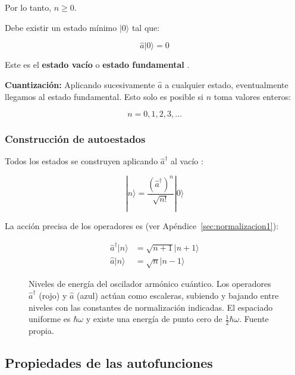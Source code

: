 \documentclass[11pt,a4paper,spanish]{book}
\begin{document}
Por lo tanto, $n \geq 0$.

Debe existir un estado mínimo $|0\rangle$ tal que:

\begin{equation}
	\hat{a}|0\rangle = 0
\end{equation}

Este es el \textbf{estado vacío} o \textbf{estado fundamental} \citep{dirac1930}.

\textbf{Cuantización:} Aplicando sucesivamente $\hat{a}$ a cualquier estado, eventualmente llegamos al estado fundamental. Esto solo es posible si $n$ toma valores enteros:

\begin{equation}
	\boxed{n = 0, 1, 2, 3, \ldots}
\end{equation}


\subsubsection{Construcción de autoestados}

Todos los estados se construyen aplicando $\hat{a}^\dagger$ al vacío \citep{dirac1930}:

\begin{equation}
	|n\rangle = \frac{(\hat{a}^\dagger)^n}{\sqrt{n!}}|0\rangle
\end{equation}

La acción precisa de los operadores es (ver Apéndice~\ref{sec:normalizacion1}):

\begin{align}
	\hat{a}^\dagger|n\rangle &= \sqrt{n+1}|n+1\rangle \\
	\hat{a}|n\rangle &= \sqrt{n}|n-1\rangle
\end{align}

\begin{figure}[h]
	\centering
	
	\caption{Niveles de energía del oscilador armónico cuántico. Los operadores $\hat{a}^\dagger$ (rojo) y $\hat{a}$ (azul) actúan como escaleras, subiendo y bajando entre niveles con las constantes de normalización indicadas. El espaciado uniforme es $\hbar\omega$ y existe una energía de punto cero de $\frac{1}{2}\hbar\omega$. Fuente propia.}
	\label{fig:niveles}
\end{figure}



\subsection{Propiedades de las autofunciones}
\end{document}
